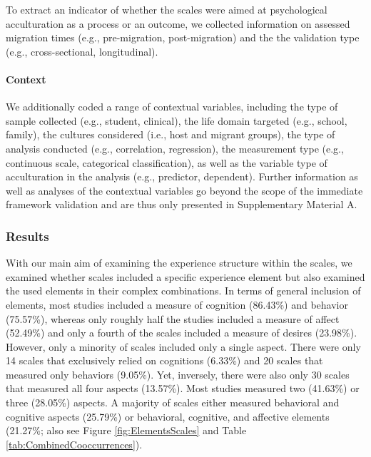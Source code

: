 To extract an indicator of whether the scales were aimed at
psychological acculturation as a process or an outcome, we collected
information on assessed migration times (e.g., pre-migration,
post-migration) and the the validation type (e.g., cross-sectional,
longitudinal).

\paragraph{Context}

We additionally coded a range of contextual variables, including the
type of sample collected (e.g., student, clinical), the life domain
targeted (e.g., school, family), the cultures considered (i.e., host and
migrant groups), the type of analysis conducted (e.g., correlation,
regression), the measurement type (e.g., continuous scale, categorical
classification), as well as the variable type of acculturation in the
analysis (e.g., predictor, dependent). Further information as well as
analyses of the contextual variables go beyond the scope of the
immediate framework validation and are thus only presented in
Supplementary Material A.

\subsubsection{Results}

With our main aim of examining the experience structure within the
scales, we examined whether scales included a specific experience
element but also examined the used elements in their complex
combinations. In terms of general inclusion of elements, most studies
included a measure of cognition (86.43\%) and behavior (75.57\%),
whereas only roughly half the studies included a measure of affect
(52.49\%) and only a fourth of the scales included a measure of desires
(23.98\%). However, only a minority of scales included only a single
aspect. There were only 14 scales that exclusively relied on cognitions
(6.33\%) and 20 scales that measured only behaviors (9.05\%). Yet,
inversely, there were also only 30 scales that measured all four aspects
(13.57\%). Most studies measured two (41.63\%) or three (28.05\%)
aspects. A majority of scales either measured behavioral and cognitive
aspects (25.79\%) or behavioral, cognitive, and affective elements
(21.27\%; also see Figure \ref{fig:ElementsScales} and Table
\ref{tab:CombinedCooccurrences}).

